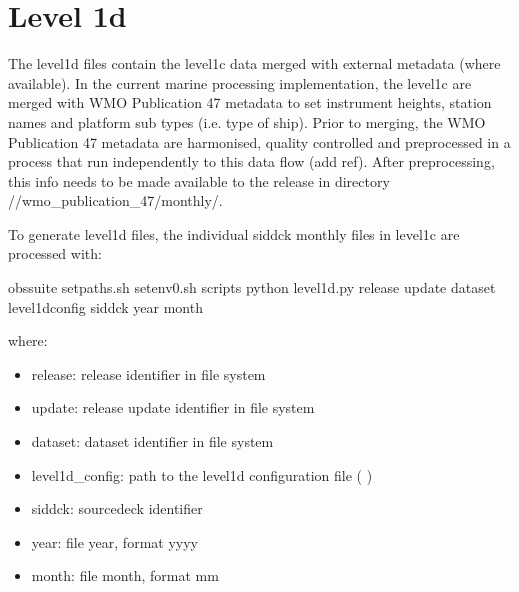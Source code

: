 \documentclass[letterpaper,10pt,english]{sphinxmanual}
\begin{document}
\chapter{Level 1d}
\label{\detokenize{index:level-1d}}
The level1d files contain the level1c data merged with external metadata (where
available). In the current marine processing implementation, the level1c are
merged with WMO Publication 47 metadata to set instrument heights, station names
and platform sub types (i.e. type of ship). Prior to merging, the WMO
Publication 47 metadata are harmonised, quality controlled and pre\sphinxhyphen{}processed in
a process that run independently to this data flow (add ref). After
pre\sphinxhyphen{}processing, this info needs to be made available to the release in directory
//wmo\_publication\_47/monthly/.

To generate level1d files, the individual sid\sphinxhyphen{}dck monthly files in level1c are
processed with:

\begin{sphinxVerbatim}[commandchars=\\\{\}]
 obs\PYGZhy{}suite
 setpaths.sh
 setenv0.sh
 scripts
python level1d.py  release update dataset level1d\PYGZus{}config sid\PYGZhy{}dck year month
\end{sphinxVerbatim}

where:
\begin{itemize}
\item {} 
release: release identifier in file system

\item {} 
update: release update identifier in file system

\item {} 
dataset: dataset identifier in file system

\item {} 
level1d\_config: path to the level1d configuration file ( {\hyperref[\detokenize{index:level1d-config-file}]{}})

\item {} 
sid\sphinxhyphen{}dck: source\sphinxhyphen{}deck identifier

\item {} 
year: file year, format yyyy

\item {} 
month: file month, format mm

\end{itemize}
\end{document}
